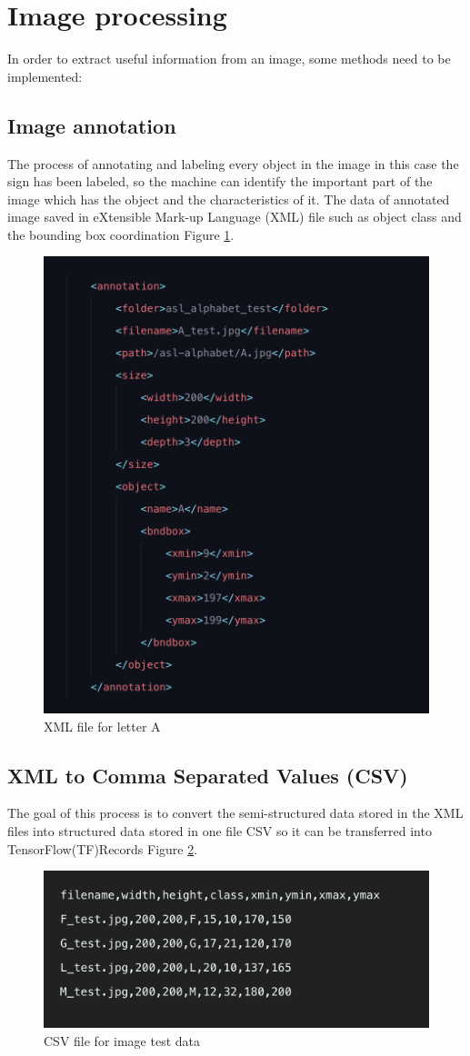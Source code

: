 \documentclass[12pt]{report}
\begin{document}
\newpage
\section{Image processing}
In order to extract useful information from an image, 
some methods need to be implemented:
\subsection{Image annotation}
The process of annotating and labeling every object in 
the image in this case the sign has been labeled, 
so the machine can identify the important part of the 
image which has the object and the characteristics of it.
The data of annotated image saved in eXtensible Mark-up 
Language (XML) file such as object class and the bounding 
box coordination Figure \ref{fig:annotation}.
\newline
\begin{figure} [h]
    \centering
    \includegraphics[width=.6\textwidth]{./images/annotation.png}
    \caption{XML file for letter A}
    \label{fig:annotation}
\end{figure}

\newpage
\subsection{XML to Comma Separated Values (CSV)}
The goal of this process is to convert the semi-structured data 
stored in the XML files into structured data stored in one file 
CSV so it can be transferred into TensorFlow(TF)Records Figure \ref{fig:csv}.
\newline
\begin{figure} [h]
    \centering
    \includegraphics[width=.8\textwidth]{./images/csv.png}
    \caption{CSV file for image test data}
    \label{fig:csv}
\end{figure}
\end{document}
